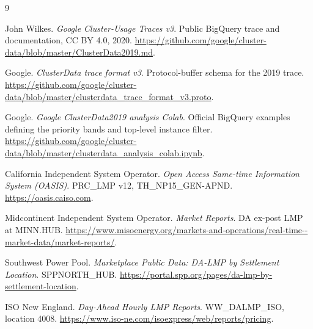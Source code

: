 \documentclass[conference]{IEEEtran}
\begin{document}
\begin{thebibliography}{9}

John Wilkes.
\newblock \emph{Google Cluster-Usage Traces v3}.
\newblock Public BigQuery trace and documentation, CC BY 4.0, 2020.
\newblock \url{https://github.com/google/cluster-data/blob/master/ClusterData2019.md}.

Google.
\newblock \emph{ClusterData trace format v3}.
\newblock Protocol-buffer schema for the 2019 trace.
\newblock \url{https://github.com/google/cluster-data/blob/master/clusterdata_trace_format_v3.proto}.

Google.
\newblock \emph{Google ClusterData2019 analysis Colab}.
\newblock Official BigQuery examples defining the priority bands and top-level
instance filter.
\newblock \url{https://github.com/google/cluster-data/blob/master/clusterdata_analysis_colab.ipynb}.

California Independent System Operator.
\newblock \emph{Open Access Same-time Information System (OASIS)}.
\newblock PRC\_LMP v12, TH\_NP15\_GEN-APND.
\newblock \url{https://oasis.caiso.com}.

Midcontinent Independent System Operator.
\newblock \emph{Market Reports}.
\newblock DA ex-post LMP at MINN.HUB.
\newblock \url{https://www.misoenergy.org/markets-and-operations/real-time--market-data/market-reports/}.

Southwest Power Pool.
\newblock \emph{Marketplace Public Data: DA-LMP by Settlement Location}.
\newblock SPPNORTH\_HUB.
\newblock \url{https://portal.spp.org/pages/da-lmp-by-settlement-location}.

ISO New England.
\newblock \emph{Day-Ahead Hourly LMP Reports}.
\newblock WW\_DALMP\_ISO, location 4008.
\newblock \url{https://www.iso-ne.com/isoexpress/web/reports/pricing}.

\end{thebibliography}
\end{document}
